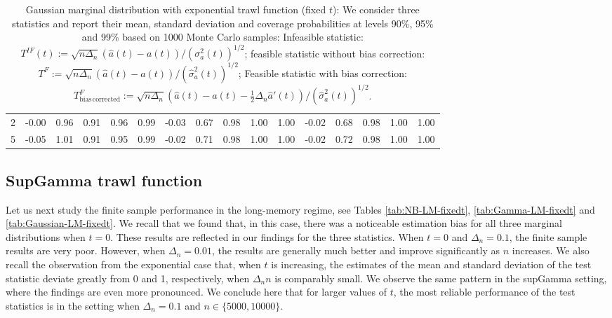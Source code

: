 \documentclass{article}
\theoremstyle{plain}
\theoremstyle{definition}
\theoremstyle{remark}
\begin{document}
\begin{appendix}
{\begin{table}[ht]
\begin{tabular}{r|rrrrr|rrrrr|rrrrr}
  2 & -0.00 & 0.96 & 0.91 & 0.96 & 0.99 & -0.03 & 0.67 & 0.98 & 1.00 & 1.00 & -0.02 & 0.68 & 0.98 & 1.00 & 1.00 \\ 
  5 & -0.05 & 1.01 & 0.91 & 0.95 & 0.99 & -0.02 & 0.71 & 0.98 & 1.00 & 1.00 & -0.02 & 0.72 & 0.98 & 1.00 & 1.00 \\ 
   \bottomrule
\end{tabular}
\caption{ \label{tab:Gaussian-Exp-fixedt} Gaussian marginal distribution with exponential trawl function (fixed $t$): We consider three statistics and report their mean, standard deviation and coverage probabilities at levels 90\%, 95\% and 99\% based on 1000 Monte Carlo samples:
Infeasible statistic:
	$T^{IF}(t):=\sqrt{n\Delta_{n}}\left(\hat{a}(t)-a(t)\right)/(\sigma_a^2(t))^{1/2}$; feasible statistic without bias correction:
	$T^{F}:=\sqrt{n\Delta_{n}}\left(\hat{a}(t)-a(t)\right)/(\hat \sigma_a^2(t))^{1/2}$; Feasible statistic with bias correction:
	$T^{F}_{\mathrm{bias \, corrected}}:=\sqrt{n\Delta_{n}}\left(\hat{a}(t)-a(t)-\frac{1}{2}\Delta_n \hat a'(t)\right)/(\hat \sigma_a^2(t))^{1/2}$.}
\end{table}
	
}


 

\subsection{SupGamma trawl function}
Let us next study the finite sample performance in the long-memory regime, see Tables  
\ref{tab:NB-LM-fixedt},
\ref{tab:Gamma-LM-fixedt} and 
\ref{tab:Gaussian-LM-fixedt}. 
We recall that we found that, in this case, there was a noticeable estimation bias for all three marginal distributions when $t=0$. These results are reflected in our findings for the three statistics.
When $t=0$ and $\Delta_n=0.1$, the finite sample results are very poor. However, when $\Delta_n=0.01$, the results are generally much better and improve significantly as $n$ increases.
We also recall the observation from the exponential case that, when $t$ is increasing, the estimates of the mean and standard deviation of the test statistic deviate greatly from 0 and 1, respectively, when $\Delta_n n$ is comparably small. We observe the same pattern in the supGamma setting, where the findings are even more pronounced. We conclude here that for larger values of $t$, the most reliable performance of the test statistics is in the setting when $\Delta_n=0.1$ and $n \in \{5000, 10000\}$. 


\end{appendix}
\end{document}
